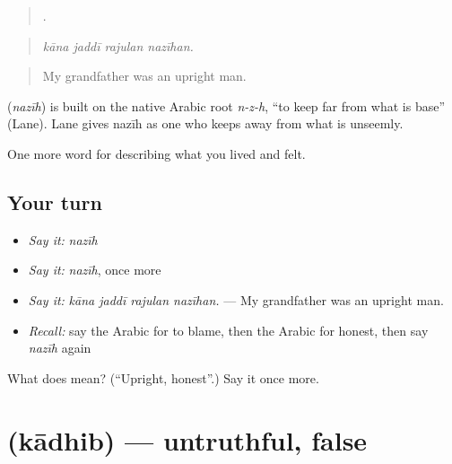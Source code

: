 \begin{quote}
   .
\end{quote}

\begin{quote}
\emph{kāna jaddī rajulan nazīhan.}
\end{quote}

\begin{quote}
My grandfather was an upright man.
\end{quote}

\begin{cousinweb}
\textbf{} (\emph{nazīh}) is built on the native Arabic root \emph{n-z-h}, \textquotedblleft{}to keep far from what is base\textquotedblright{} (Lane). Lane gives nazīh as one who keeps away from what is unseemly.
\end{cousinweb}

\begin{grammarlens}[title={What you've built}]
One more word for describing what you lived and felt.
\end{grammarlens}

\subsection*{Your turn}
\begin{itemize}
\raggedright
  \item \emph{Say it:} \emph{nazīh}
  \item \emph{Say it:} \emph{nazīh}, once more
  \item \emph{Say it:} \emph{kāna jaddī rajulan nazīhan.} — My grandfather was an upright man.
  \item \emph{Recall:} say the Arabic for to blame, then the Arabic for honest, then say \emph{nazīh} again
\end{itemize}

\begin{tcolorbox}[breakable,colback=teal!4,colframe=teal!35!black,title={Before you move on}]
What does  mean? (\textquotedblleft{}Upright, honest\textquotedblright{}.) Say it once more.
\end{tcolorbox}
\section[\texorpdfstring{\ar{كاذب} (kādhib)}{كاذب (kādhib)}]{ (kādhib) — untruthful, false}

\label{lesson:AR-C499-kadhib}



